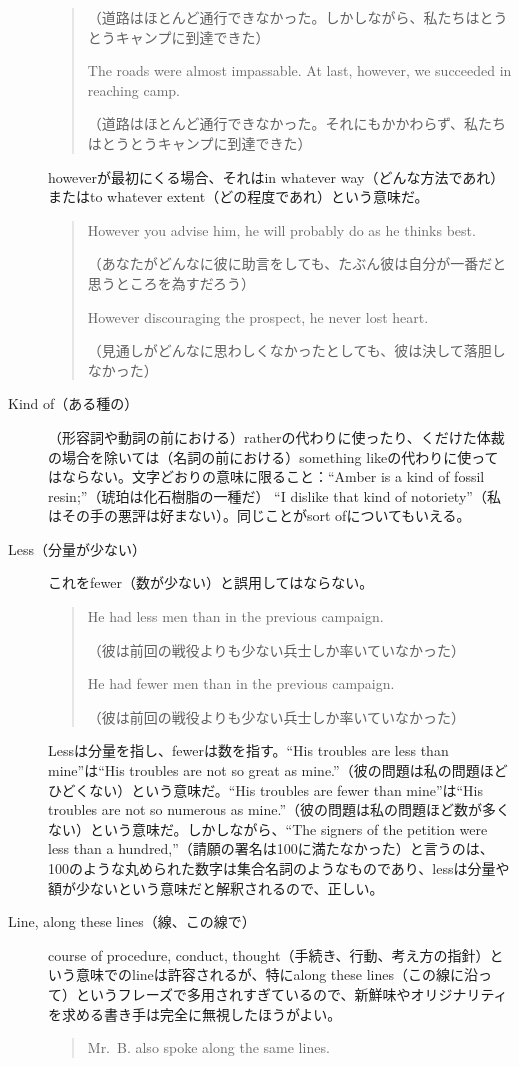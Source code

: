 \begin{description}
\begin{quote}
（道路はほとんど通行できなかった。しかしながら、私たちはとうとうキャンプに到達できた）

The roads were almost impassable. At last, however, we succeeded
in reaching camp.

（道路はほとんど通行できなかった。それにもかかわらず、私たちはとうとうキャンプに到達できた）
\end{quote}
howeverが最初にくる場合、それはin whatever way（どんな方法であれ）またはto whatever extent（どの程度であれ）という意味だ。
\begin{quote}
    However you advise him, he will probably do as he thinks best.
    
    （あなたがどんなに彼に助言をしても、たぶん彼は自分が一番だと思うところを為すだろう）
    
    However discouraging the prospect, he never lost heart.
    
    （見通しがどんなに思わしくなかったとしても、彼は決して落胆しなかった）
\end{quote}
\item [Kind of（ある種の）]
（形容詞や動詞の前における）ratherの代わりに使ったり、くだけた体裁の場合を除いては（名詞の前における）something
likeの代わりに使ってはならない。文字どおりの意味に限ること：``Amber is a
kind of fossil resin;''（琥珀は化石樹脂の一種だ） ``I dislike that kind
of notoriety''（私はその手の悪評は好まない）。同じことがsort
ofについてもいえる。
\item [Less（分量が少ない）]これをfewer（数が少ない）と誤用してはならない。
\begin{quote}
    He had less men than in the previous campaign.
    
    （彼は前回の戦役よりも少ない兵士しか率いていなかった）
    
    He had fewer men than in the previous campaign.
    
    （彼は前回の戦役よりも少ない兵士しか率いていなかった）
\end{quote}
Lessは分量を指し、fewerは数を指す。``His troubles are less than
mine''は``His troubles are not so great as
mine.''（彼の問題は私の問題ほどひどくない）という意味だ。``His troubles
are fewer than mine''は``His troubles are not so numerous as
mine.''（彼の問題は私の問題ほど数が多くない）という意味だ。しかしながら、``The
signers of the petition were less than a
hundred,''（請願の署名は100に満たなかった）と言うのは、100のような丸められた数字は集合名詞のようなものであり、lessは分量や額が少ないという意味だと解釈されるので、正しい。
\item [Line, along these lines（線、この線で）]course of procedure, conduct,
thought（手続き、行動、考え方の指針）という意味でのlineは許容されるが、特にalong
these
lines（この線に沿って）というフレーズで多用されすぎているので、新鮮味やオリジナリティを求める書き手は完全に無視したほうがよい。
\begin{quote}
    Mr.~B. also spoke along the same lines.
    

\end{quote}
\end{description}
